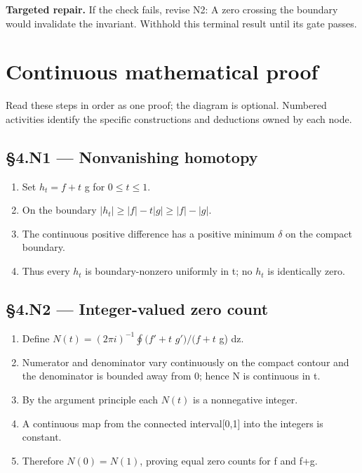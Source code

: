 \documentclass[preprint,12pt,aps,pra,showkeys,amsmath,amssymb,superscriptaddress,floatfix]{revtex4-2}
\theoremstyle{definition}
\theoremstyle{remark}
\newcommand{\field}[2]{\par\smallskip\noindent\textbf{#1.} #2\par}
\begin{document}
\field{Targeted repair}{If the check fails, revise N2: A zero crossing the boundary would
invalidate the invariant. Withhold this terminal result until its gate
passes.}

\endgroup\clearpage\section{Continuous mathematical proof}\label{sec:proof}

Read these steps in order as one proof; the diagram is optional.
Numbered activities identify the specific constructions and deductions
owned by each node.

\subsection{§4.N1 --- Nonvanishing
homotopy}\label{n1-nonvanishing-homotopy}

\begin{enumerate}
\def\labelenumi{\arabic{enumi}.}
\item
  Set \(h_t=f+t\) g for \(0\le t\le 1\).
\item
  On the boundary \(|h_t|\ge |f|-t|g|\ge |f|-|g|\).
\item
  The continuous positive difference has a positive minimum \(\delta\)
  on the compact boundary.
\item
  Thus every \(h_t\) is boundary-nonzero uniformly in t; no \(h_t\) is
  identically zero.
\end{enumerate}

\subsection{§4.N2 --- Integer-valued zero
count}\label{n2-integer-valued-zero-count}

\begin{enumerate}
\def\labelenumi{\arabic{enumi}.}
\item
  Define \(N(t)=(2\pi i)^{-1}\oint (f'+t\) \(g')/(f+t\) g) dz.
\item
  Numerator and denominator vary continuously on the compact contour and
  the denominator is bounded away from 0; hence N is continuous in t.
\item
  By the argument principle each \(N(t)\) is a nonnegative integer.
\item
  A continuous map from the connected interval{[}0,1{]} into the
  integers is constant.
\item
  Therefore \(N(0)=N(1)\), proving equal zero counts for f and f+g.
\end{enumerate}
\end{document}

